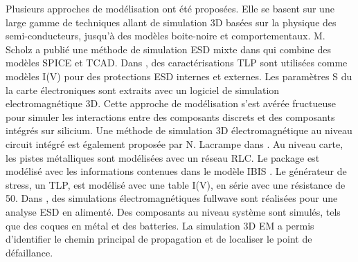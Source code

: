Plusieurs approches de modélisation ont été proposées.
Elle se basent sur une large gamme de techniques allant de simulation 3D basées sur la physique des semi-conducteurs, jusqu'à des modèles boite-noire et comportementaux.
M. Scholz a publié une méthode de simulation ESD mixte dans \cite{mixedModeESDSims} qui combine des modèles SPICE et TCAD.
Dans \cite{usb2ESDProtection}, des caractérisations TLP sont utilisées comme modèles I(V) pour des protections ESD internes et externes.
Les paramètres S du la carte électroniques sont extraits avec un logiciel de simulation electromagnétique 3D.
Cette approche de modélisation s'est avérée fructueuse pour simuler les interactions entre des composants discrets et des composants intégrés sur silicium.
Une méthode de simulation 3D électromagnétique au niveau circuit intégré est également proposée par N. Lacrampe dans \cite{LacrampeTransientImmunity}.
Au niveau carte, les pistes métalliques sont modélisées avec un réseau RLC.
Le package est modélisé avec les informations contenues dans le modèle IBIS \cite{ibis-spec}.
Le générateur de stress, un TLP, est modélisé avec une table I(V), en série avec une résistance de 50\textOmega{}.
Dans \cite{softFailMobile}, des simulations électromagnétiques fullwave sont réalisées pour une analyse ESD en alimenté.
Des composants au niveau système sont simulés, tels que des coques en métal et des batteries.
La simulation 3D EM a permis d'identifier le chemin principal de propagation et de localiser le point de défaillance.
